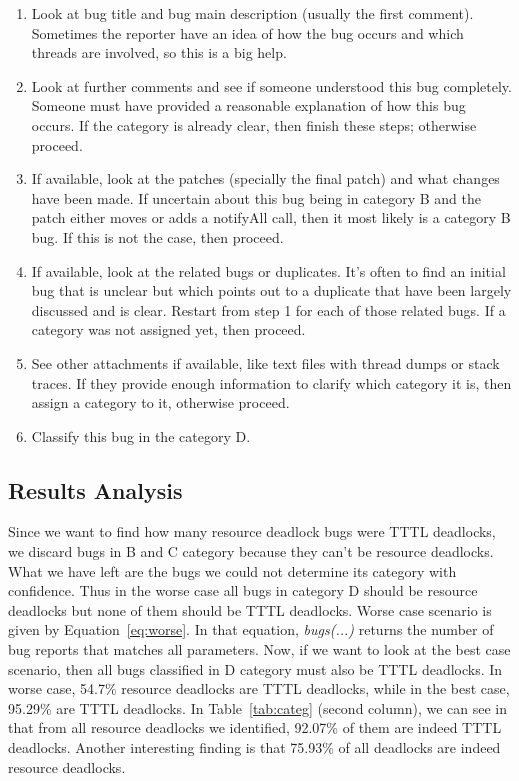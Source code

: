 \begin{enumerate}
\item Look at bug title and bug main description (usually the first comment). Sometimes the reporter have an idea of how the bug occurs and which threads are involved, so this is a big help.

\item Look at further comments and see if someone understood this bug completely. Someone must have provided a reasonable explanation of how this bug occurs. If the category is already clear, then finish these steps; otherwise proceed.

\item If available, look at the patches (specially the final patch) and what changes have been made. If uncertain about this bug being in category B and the patch either moves or adds a notifyAll call, then it most likely is a category B bug. If this is not the case, then proceed.

\item If available, look at the related bugs or duplicates. It's often to find an initial bug that is unclear but which points out to a duplicate that have been largely discussed and is clear. Restart from step 1 for each of those related bugs. If a category was not assigned yet, then proceed.

\item See other attachments if available, like text files with thread dumps or stack traces. If they provide enough information to clarify which category it is, then assign a category to it, otherwise proceed.

\item Classify this bug in the category D.
\end{enumerate}

\subsection{Results Analysis}

Since we want to find how many resource deadlock bugs were TTTL deadlocks, we discard bugs in B and C category because they can't be resource deadlocks. What we have left are the bugs we could not determine its category with confidence. Thus in the worse case all bugs in category D should be resource deadlocks but none of them should be TTTL deadlocks. Worse case scenario is given by Equation~\ref{eq:worse}. In that equation, \emph{bugs(...)} returns the number of bug reports that matches all parameters. Now, if we want to look at the best case scenario, then all bugs classified in D category must also be TTTL deadlocks. In worse case, 54.7\% resource deadlocks are TTTL deadlocks, while in the best case, 95.29\% are TTTL deadlocks. In Table~\ref{tab:categ} (second column), we can see in that from all resource deadlocks we identified, 92.07\% of them are indeed TTTL deadlocks.
Another interesting finding is that 75.93\% of all deadlocks are indeed resource deadlocks.

